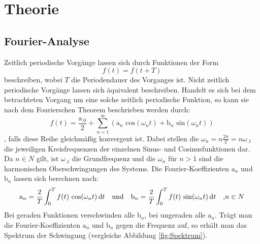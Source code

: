 
\section{Theorie}
\label{sec:Theorie}

\subsection{Fourier-Analyse}\label{subsec:F-A}
Zeitlich periodische Vorgänge lassen sich durch Funktionen der Form
\[
f(t) = f(t+T)
\]
beschreiben, wobei $T$ die Periodendauer des Vorganges ist.
Nicht zeitlich periodische Vorgänge lassen sich äquivalent beschreiben.
Handelt es sich bei dem betrachteten Vorgang um eine solche zeitlich periodische Funktion, so kann sie nach dem Fourierschen Theorem beschrieben werden durch:
\begin{equation}
f(t) = \frac{\mathrm{a}_.0}{2} + \sum_{n=1}^\infty\left(\mathrm{a}_n\text{ cos}(\omega_nt)+\mathrm{b}_n\text{ sin}(\omega_nt)\right)
\end{equation}
, falls diese Reihe gleichmäßig konvergent ist. 
Dabei stellen die $\omega_n=n\frac{2\pi}{T}=n\omega_.1$ die jeweiligen Kreisfrequenzen der einzelnen Sinus- und Cosinusfunktionen dar. Da $n\in N$ gilt, ist $\omega_.1$ die Grundfrequenz und die $\omega_n$ für $n>1$ sind die harmonischen Oberschwingungen des Systems.
Die Fourier-Koeffizienten $\mathrm{a}_n$ und $\mathrm{b}_n$ lassen sich berechnen nach:
\begin{equation}
\mathrm{a}_n = \frac{2}{T}\int_0^Tf(t)\text{ cos}(\omega_nt)\mathop{}\!\mathrm{d} t\text{\hspace{1em}und\hspace{1em}}\mathrm{b}_n=\frac{2}{T}\int_0^Tf(t)\text{ sin}(\omega_nt)\mathop{}\!\mathrm{d} t\text{\hspace{1em},}n\in N \label{eq:Koeffizienten}
\end{equation}   
Bei geraden Funktionen verschwinden alle $\mathrm{b}_n$, bei ungeraden alle $\mathrm{a}_n$. 
Trägt man die Fourier-Koeffizienten $\mathrm{a}_n$ und $\mathrm{b}_n$ gegen die Frequenz auf, so erhält man das Spektrum der Schwingung (vergleiche Abbildung \ref{fig:Spektrum}).
